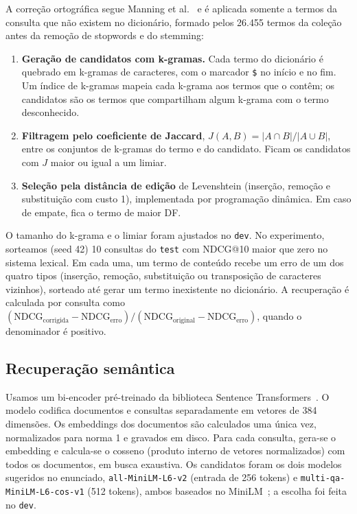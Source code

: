 \documentclass[11pt,a4paper]{article}
\newcommand{\cod}[1]{\texttt{#1}}
\begin{document}
A correção ortográfica segue Manning et al.~\cite{manning2008} e é aplicada somente a termos da consulta que não existem no dicionário, formado pelos 26.455 termos da coleção antes da remoção de stopwords e do stemming:
\begin{enumerate}
\item \textbf{Geração de candidatos com k-gramas.} Cada termo do dicionário é quebrado em k-gramas de caracteres, com o marcador \cod{\$} no início e no fim. Um índice de k-gramas mapeia cada k-grama aos termos que o contêm; os candidatos são os termos que compartilham algum k-grama com o termo desconhecido.
\item \textbf{Filtragem pelo coeficiente de Jaccard}, $J(A,B)=|A\cap B|/|A\cup B|$, entre os conjuntos de k-gramas do termo e do candidato. Ficam os candidatos com $J$ maior ou igual a um limiar.
\item \textbf{Seleção pela distância de edição} de Levenshtein (inserção, remoção e substituição com custo 1), implementada por programação dinâmica. Em caso de empate, fica o termo de maior DF.
\end{enumerate}
O tamanho do k-grama e o limiar foram ajustados no \cod{dev}. No experimento, sorteamos (seed 42) 10 consultas do \cod{test} com NDCG@10 maior que zero no sistema lexical. Em cada uma, um termo de conteúdo recebe um erro de um dos quatro tipos (inserção, remoção, substituição ou transposição de caracteres vizinhos), sorteado até gerar um termo inexistente no dicionário. A recuperação é calculada por consulta como
$(\mathrm{NDCG}_{\text{corrigida}}-\mathrm{NDCG}_{\text{erro}})/(\mathrm{NDCG}_{\text{original}}-\mathrm{NDCG}_{\text{erro}})$, quando o denominador é positivo.

\subsection{Recuperação semântica}

Usamos um bi-encoder pré-treinado da biblioteca Sentence Transformers~\cite{reimers2019}. O modelo codifica documentos e consultas separadamente em vetores de 384 dimensões. Os embeddings dos documentos são calculados uma única vez, normalizados para norma 1 e gravados em disco. Para cada consulta, gera-se o embedding e calcula-se o cosseno (produto interno de vetores normalizados) com todos os documentos, em busca exaustiva. Os candidatos foram os dois modelos sugeridos no enunciado, \cod{all-MiniLM-L6-v2} (entrada de 256 tokens) e \cod{multi-qa-MiniLM-L6-cos-v1} (512 tokens), ambos baseados no MiniLM~\cite{wang2020}; a escolha foi feita no \cod{dev}.
\end{document}

